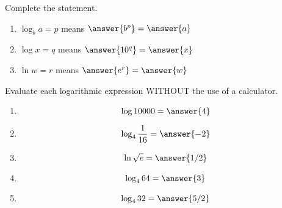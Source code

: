 \documentclass{ximera}
\begin{document}
\begin{problem}\label{prob:160hom7prob8}
Complete the statement.
 \begin{enumerate}
     \item 
 $\log_b a=p$ means $\answer{b^p}=\answer{a}$
 \item
 $\log x=q$ means $\answer{10^q}=\answer{x}$
 \item
 $\ln w=r$ means $\answer{e^r}=\answer{w}$
 \end{enumerate}
 \end{problem}
 
 \begin{problem}\label{prob:160hom7prob9}
 Evaluate each logarithmic expression WITHOUT the use of a calculator.
 \begin{enumerate}
     \item $$\log 10000=\answer{4}$$
     \item $$\log_4\frac{1}{16}=\answer{-2}$$
     \item $$\ln\sqrt{e}=\answer{1/2}$$
     \item $$\log_4 64=\answer{3}$$
     \item $$\log_4 32=\answer{5/2}$$
 \end{enumerate}
 \end{problem}
 
 
\end{document}
